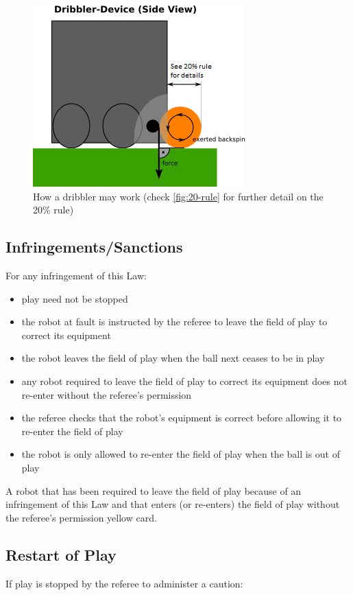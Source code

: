 \begin{figure}[ht]
	\centering
	\includegraphics[width=0.5\columnwidth]{img/dribblers_1.png}
	\caption{How a dribbler may work (check \autoref{fig:20-rule} for further detail on the 20\% rule)}
	\label{fig:dribblers}
\end{figure}

\subsection{Infringements/Sanctions}
For any infringement of this Law:

\begin{itemize}
\item play need not be stopped
\item the robot at fault is instructed by the referee to leave the field of play to correct its equipment
\item the robot leaves the field of play when the ball next ceases to be in play
\item any robot required to leave the field of play to correct its equipment does not re-enter without the referee's permission
\item the referee checks that the robot's equipment is correct before allowing it to re-enter the field of play
\item the robot is only allowed to re-enter the field of play when the ball is out of play
\end{itemize}

A robot that has been required to leave the field of play because of an infringement of this Law and that enters (or re-enters) the field of play without the referee's permission   yellow card.

\subsection{Restart of Play}
If play is stopped by the referee to administer a caution:

